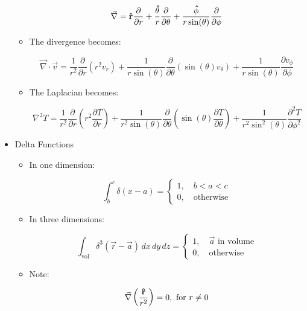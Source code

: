 \begin{itemize}
\begin{itemize}
          $$\vec{\nabla}=\bold{\hat{r}}\frac{\partial}{\partial r}+\frac{\bold{\hat{\theta}}}{r}\frac{\partial}{\partial \theta}+\frac{\bold{\hat{\phi}}}{r\sin(\theta)}\frac{\partial}{\partial \phi}$$

        \item The divergence becomes:

          $$\vec{\nabla}\cdot\vec{v}=\frac{1}{r^2}\frac{\partial}{\partial r}(r^2v_r)+\frac{1}{r\sin(\theta)}\frac{\partial}{\partial \theta}(\sin(\theta)v_{\theta})+\frac{1}{r\sin(\theta)}\frac{\partial v_{\phi}}{\partial \phi}$$

        \item The Laplacian becomes:

          $$\nabla^2 T=\frac{1}{r^2}\frac{\partial}{\partial r}\left( r^2\frac{\partial T}{\partial r} \right)+\frac{1}{r^2\sin(\theta)}\frac{\partial}{\partial \theta}\left( \sin(\theta)\frac{\partial T}{\partial \theta} \right)+\frac{1}{r^2\sin^2(\theta)}\frac{\partial^2T}{\partial\phi^2}$$

    \end{itemize}

  \item Delta Functions

    \begin{itemize}

      \item In one dimension:

        $$\int_b^c \delta(x-a)=\left\{\begin{array}{l}1,\quad b<a<c\\0,\quad\text{otherwise}\end{array}$$

      \item In three dimensions:

        $$\int_{\text{vol}} \delta^3(\vec{r}-\vec{a})\,dx\,dy\,dz=\left\{\begin{array}{l}1,\quad\vec{a}\text{ in volume}\\0,\quad\text{otherwise}\end{array}$$

        \item Note:

          $$\vec{\nabla}\left( \frac{\bold{\hat{r}}}{r^2} \right)=0,\text{ for }r\neq0$$

    \end{itemize}

\end{itemize}



